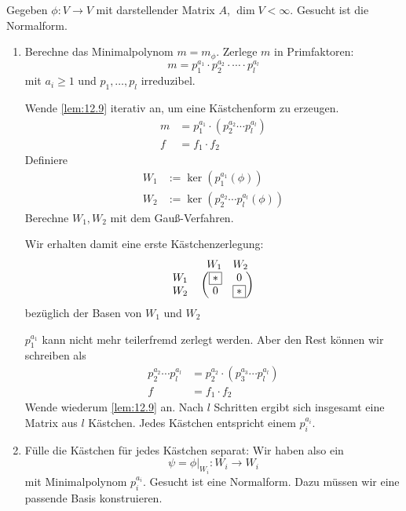 \documentclass[a4paper, 10pt]{scrbook}
\begin{document}
\begin{ex}
	Gegeben $\phi: V\to V$ mit darstellender Matrix $A$, $\dim V<\infty$.
	Gesucht ist die Normalform.
	\begin{enumerate}[1{. Schritt}]
		\item
			Berechne das Minimalpolynom $m=m_\phi$.
			Zerlege $m$ in Primfaktoren:
			\[
				m = p_1^{a_1}\cdot p_2^{a_2} \cdot \dotsb \cdot p_l^{a_l}
			\]
			mit $a_i\ge 1$ und $p_1,\dotsc, p_l$ irreduzibel.

			Wende \ref{lem:12.9} iterativ an, um eine Kästchenform zu erzeugen.
			\begin{align*}
				m&=p_1^{a_1}\cdot (p_2^{a_2}\dotsb p_l^{a_l})\\
				f &= f_1\cdot f_2
			\end{align*}
			Definiere
			\begin{align*}
				W_1 &:= \ker(p_1^{a_1}(\phi))\\
				W_2 &:= \ker(p_2^{a_2}\dotsb p_l^{a_l}(\phi))
			\end{align*}
			Berechne $W_1, W_2$ mit dem Gauß-Verfahren.

			Wir erhalten damit eine erste Kästchenzerlegung:
			\[
			\begin{tabular}{*{3}{>{$}c<{$}}}
			 & \begin{matrix}
			   W_1 & W_2
			 \end{matrix} \\
			 \begin{matrix}
			   W_1 \\ W_2
			 \end{matrix} &
				\begin{pmatrix}
					\fbox{$*$} & 0 \\ 0 & \fbox{$*$}
				\end{pmatrix}
			\end{tabular}
			\]
			bezüglich der Basen von $W_1$ und $W_2$

			$p_1^{a_1}$ kann nicht mehr teilerfremd zerlegt werden.
			Aber den Rest können wir schreiben als
			\begin{align*}
				p_2^{a_2}\dotsb p_l^{a_l} &= p_2^{a_2}\cdot (p_3^{a_3}\dotsb p_l^{a_l})\\
				f &= f_1\cdot f_2
			\end{align*}
			Wende wiederum \ref{lem:12.9} an.  Nach $l$  Schritten ergibt sich insgesamt eine Matrix aus $\mathit{l}$ Kästchen.  Jedes Kästchen entspricht einem $p_i^{a_i}$.

		\item
			Fülle die Kästchen für jedes Kästchen separat:
			Wir haben also  ein
			\[
				\psi=\phi|_{W_i} : W_i \to W_i
			\]
			mit Minimalpolynom $p_i^{a_i}$.
			Gesucht ist eine Normalform.
			Dazu müssen wir eine passende Basis konstruieren.


\end{enumerate}
\end{ex}
\end{document}

